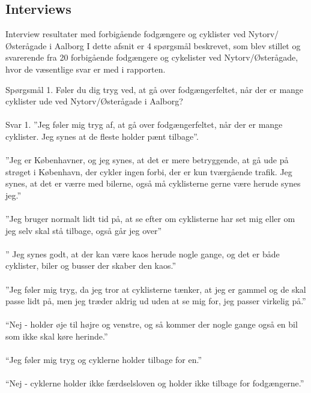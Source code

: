 \appendix
\label{appendix_start}

\begin{appendics}
  \chapter{Interviews}
  \label{chap:interviews}
Interview resultater med forbigående fodgængere og cyklister ved Nytorv/Østerågade i Aalborg I dette afsnit er 4 spørgsmål beskrevet, som blev stillet og svarerende fra 20 forbigående fodgængere og cykelister ved Nytorv/Østerågade, hvor de væsentlige svar er med i rapporten.

  Spørgsmål 1.
  Føler du dig tryg ved, at gå over fodgængerfeltet, når der er mange cyklister ude ved Nytorv/Østerågade i Aalborg?
\\\\
  Svar 1.
  ”Jeg føler mig tryg af, at gå over fodgængerfeltet, når der er mange cyklister. Jeg synes at de fleste holder pænt tilbage”.
\\\\
  ”Jeg er Københavner, og jeg synes, at det er mere betryggende, at gå ude på strøget i København, der cykler ingen forbi, der er kun tværgående trafik. Jeg synes, at det er værre med bilerne, også må cyklisterne gerne være herude synes jeg.”
\\\\
  ”Jeg bruger normalt lidt tid på, at se efter om cyklisterne har set mig eller om jeg selv skal stå tilbage, også går jeg over”
\\\\
  ” Jeg synes godt, at der kan være kaos herude nogle gange, og det er både cyklister, biler og busser der skaber den kaos.”
\\\\
  ”Jeg føler mig tryg, da jeg tror at cyklisterne tænker, at jeg er gammel og de skal passe lidt på, men jeg træder aldrig ud uden at se mig for, jeg passer virkelig på.”
\\\\
  “Nej - holder øje til højre og venstre, og så kommer der nogle gange også en bil som ikke skal køre herinde.”
\\\\
  “Jeg føler mig tryg og cyklerne holder tilbage for en.”
\\\\
  “Nej - cyklerne holder ikke færdselsloven og holder ikke tilbage for fodgængerne.”
\\\\

\end{appendics}
